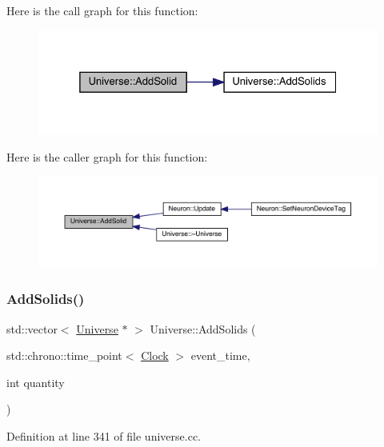 Here is the call graph for this function\+:
\nopagebreak
\begin{figure}[H]
\begin{center}
\leavevmode
\includegraphics[width=325pt]{class_universe_a598799e2fcdf9ed60e83e9f5a61bfc05_cgraph}
\end{center}
\end{figure}
Here is the caller graph for this function\+:
\nopagebreak
\begin{figure}[H]
\begin{center}
\leavevmode
\includegraphics[width=350pt]{class_universe_a598799e2fcdf9ed60e83e9f5a61bfc05_icgraph}
\end{center}
\end{figure}
\mbox{\label{class_universe_a410d5ba2224fe90584b1f1aa5b38b41c}} 
\subsubsection{\texorpdfstring{Add\+Solids()}{AddSolids()}}
{\footnotesize\ttfamily std\+::vector$<$ \hyperlink{class_universe}{Universe} $\ast$ $>$ Universe\+::\+Add\+Solids (\begin{DoxyParamCaption}\item[{std\+::chrono\+::time\+\_\+point$<$ \hyperlink{universe_8h_a0ef8d951d1ca5ab3cfaf7ab4c7a6fd80}{Clock} $>$}]{event\+\_\+time,  }\item[{int}]{quantity }\end{DoxyParamCaption})}



Definition at line 341 of file universe.\+cc.

